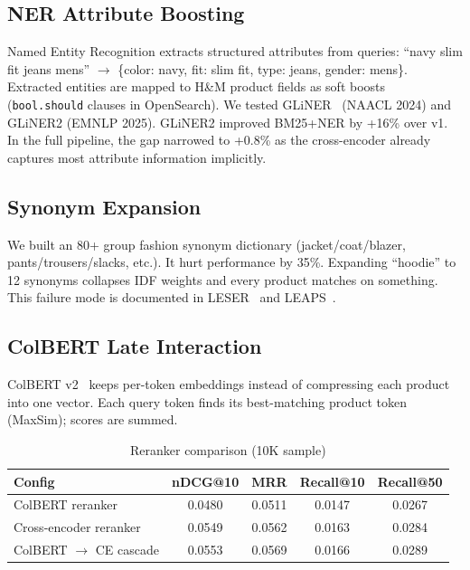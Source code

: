 \documentclass[11pt,a4paper]{article}
\begin{document}
\subsection{NER Attribute Boosting}

Named Entity Recognition extracts structured attributes from queries: ``navy slim fit jeans mens'' $\rightarrow$ \{color: navy, fit: slim fit, type: jeans, gender: mens\}. Extracted entities are mapped to H\&M product fields as soft boosts (\texttt{bool.should} clauses in OpenSearch). We tested GLiNER~\cite{gliner} (NAACL 2024) and GLiNER2 (EMNLP 2025). GLiNER2 improved BM25+NER by +16\% over v1. In the full pipeline, the gap narrowed to +0.8\% as the cross-encoder already captures most attribute information implicitly.

\subsection{Synonym Expansion}

We built an 80+ group fashion synonym dictionary (jacket/coat/blazer, pants/trousers/slacks, etc.). It hurt performance by 35\%. Expanding ``hoodie'' to 12 synonyms collapses IDF weights and every product matches on something. This failure mode is documented in LESER~\cite{leser} and LEAPS~\cite{leaps}.

\subsection{ColBERT Late Interaction}

ColBERT v2~\cite{colbert} keeps per-token embeddings instead of compressing each product into one vector. Each query token finds its best-matching product token (MaxSim); scores are summed.

\begin{table}[h]
\centering
\caption{Reranker comparison (10K sample)}
\begin{tabular}{lcccc}
\toprule
\textbf{Config} & \textbf{nDCG@10} & \textbf{MRR} & \textbf{Recall@10} & \textbf{Recall@50} \\
\midrule
ColBERT reranker & 0.0480 & 0.0511 & 0.0147 & 0.0267 \\
Cross-encoder reranker & 0.0549 & 0.0562 & 0.0163 & 0.0284 \\
ColBERT $\rightarrow$ CE cascade & 0.0553 & 0.0569 & 0.0166 & 0.0289 \\
\bottomrule
\end{tabular}
\end{table}
\end{document}
